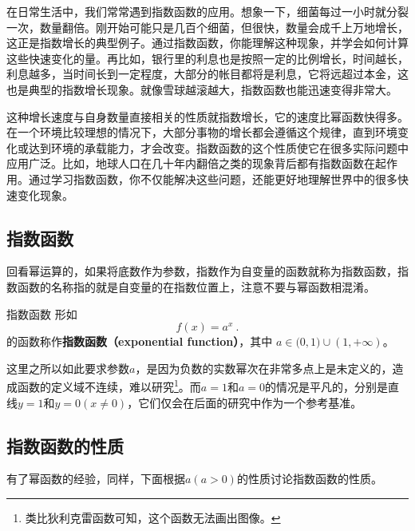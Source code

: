 

在日常生活中，我们常常遇到指数函数的应用。想象一下，细菌每过一小时就分裂一次，数量翻倍。刚开始可能只是几百个细菌，但很快，数量会成千上万地增长，这正是指数增长的典型例子。通过指数函数，你能理解这种现象，并学会如何计算这些快速变化的量。再比如，银行里的利息也是按照一定的比例增长，时间越长，利息越多，当时间长到一定程度，大部分的帐目都将是利息，它将远超过本金，这也是典型的指数增长现象。就像雪球越滚越大，指数函数也能迅速变得非常大。

这种增长速度与自身数量直接相关的性质就指数增长，它的速度比幂函数快得多。在一个环境比较理想的情况下，大部分事物的增长都会遵循这个规律，直到环境变化或达到环境的承载能力，才会改变。指数函数的这个性质使它在很多实际问题中应用广泛。比如，地球人口在几十年内翻倍之类的现象背后都有指数函数在起作用。通过学习指数函数，你不仅能解决这些问题，还能更好地理解世界中的很多快速变化现象。

\subsection{指数函数}

回看幂运算的，如果将底数作为参数，指数作为自变量的函数就称为指数函数，指数函数的名称指的就是自变量的在指数位置上，注意不要与幂函数相混淆。

\begin{definition}{指数函数}
形如
\begin{equation}
f(x) = a^x~.
\end{equation}
的函数称作\textbf{指数函数（exponential function）}，其中 $a\in\mathbb (0,1)\cup(1,+\infty)$。
\end{definition}

这里之所以如此要求参数$a$，是因为负数的实数幂次在非常多点上是未定义的，造成函数的定义域不连续，难以研究\footnote{类比狄利克雷函数可知，这个函数无法画出图像。}。而$a=1$和$a=0$的情况是平凡的，分别是直线$y=1$和$y=0(x\neq0)$，它们仅会在后面的研究中作为一个参考基准。

\subsection{指数函数的性质}

有了幂函数的经验，同样，下面根据$a(a>0)$的性质讨论指数函数的性质。

